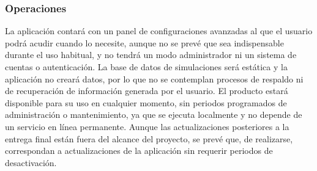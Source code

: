 \subsubsection{Operaciones}{\color{black}
 La aplicación contará con un panel de configuraciones avanzadas al que el usuario podrá acudir cuando lo necesite, aunque no se prevé que sea indispensable durante el uso habitual, y no tendrá un modo administrador ni un sistema de cuentas o autenticación. La base de datos de simulaciones será estática y la aplicación no creará datos, por lo que no se contemplan procesos de respaldo ni de recuperación de información generada por el usuario. El producto estará disponible para su uso en cualquier momento, sin periodos programados de administración o mantenimiento, ya que se ejecuta localmente y no depende de un servicio en línea permanente. Aunque las actualizaciones posteriores a la entrega final están fuera del alcance del proyecto, se prevé que, de realizarse, correspondan a actualizaciones de la aplicación sin requerir periodos de desactivación.
}